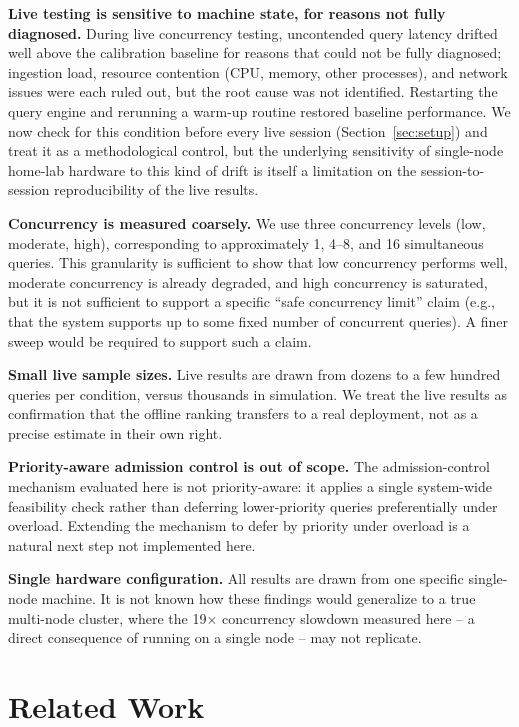 \documentclass[conference]{IEEEtran}
\begin{document}
\textbf{Live testing is sensitive to machine state, for reasons not fully diagnosed.} During live concurrency testing, uncontended query latency drifted well above the calibration baseline for reasons that could not be fully diagnosed; ingestion load, resource contention (CPU, memory, other processes), and network issues were each ruled out, but the root cause was not identified. Restarting the query engine and rerunning a warm-up routine restored baseline performance. We now check for this condition before every live session (Section~\ref{sec:setup}) and treat it as a methodological control, but the underlying sensitivity of single-node home-lab hardware to this kind of drift is itself a limitation on the session-to-session reproducibility of the live results.

\textbf{Concurrency is measured coarsely.} We use three concurrency levels (low, moderate, high), corresponding to approximately 1, 4--8, and 16 simultaneous queries. This granularity is sufficient to show that low concurrency performs well, moderate concurrency is already degraded, and high concurrency is saturated, but it is not sufficient to support a specific ``safe concurrency limit'' claim (e.g., that the system supports up to some fixed number of concurrent queries). A finer sweep would be required to support such a claim.

\textbf{Small live sample sizes.} Live results are drawn from dozens to a few hundred queries per condition, versus thousands in simulation. We treat the live results as confirmation that the offline ranking transfers to a real deployment, not as a precise estimate in their own right.

\textbf{Priority-aware admission control is out of scope.} The admission-control mechanism evaluated here is not priority-aware: it applies a single system-wide feasibility check rather than deferring lower-priority queries preferentially under overload. Extending the mechanism to defer by priority under overload is a natural next step not implemented here.

\textbf{Single hardware configuration.} All results are drawn from one specific single-node machine. It is not known how these findings would generalize to a true multi-node cluster, where the 19$\times$ concurrency slowdown measured here -- a direct consequence of running on a single node -- may not replicate.

\section{Related Work}
\end{document}
